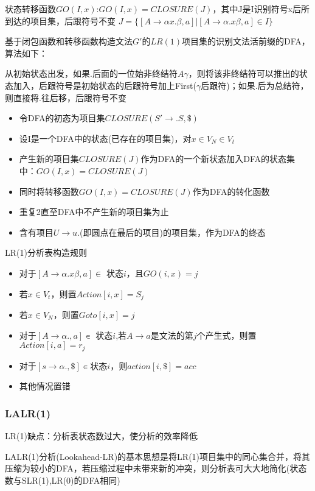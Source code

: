 \documentclass[utf8]{ctexart}
\begin{document}
状态转移函数$GO(I,x)$:$GO(I,x)=CLOSURE(J)$，其中J是I识别符号x后所到达的项目集，后跟符号不变
$J=\{[A \rightarrow \alpha x.\beta,a]|[A \rightarrow \alpha .x\beta ,a]\in I\}$

基于闭包函数和转移函数构造文法$G'$的$LR(1)$项目集的识别文法活前缀的DFA，算法如下：

从初始状态出发，如果.后面的一位始非终结符$A\gamma$，则将该非终结符可以推出的状态加入，后跟符号是初始状态的后跟符号加上First($\gamma$后跟符)；如果.后为总结符，则直接将.往后移，后跟符号不变
\begin{itemize}
    \item 令DFA的初态为项目集$CLOSURE({S' \rightarrow .S,\$})$
    \item 设I是一个DFA中的状态(已存在的项目集)，对$x \in V_N \in V_t$
    \item 产生新的项目集$CLOSURE(J)$作为DFA的一个新状态加入DFA的状态集中：$GO(I,x)=CLOSURE(J)$
    \item 同时将转移函数$GO(I,x)=CLOSURE(J)$作为DFA的转化函数
    \item 重复2直至DFA中不产生新的项目集为止
    \item 含有项目$U \rightarrow u.$(即圆点在最后的项目)的项目集，作为DFA的终态
\end{itemize}

\noindent LR(1)分析表构造规则
\begin{itemize}
    \item 对于$[A \rightarrow \alpha .x \beta,a] \in$ 状态$i$，且$GO(i,x)=j$
    \item 若$x \in V_t$，则置$Action[i,x]=S_j$
    \item 若$x \in V_N$，则置$Goto[i,x]=j$
    \item 对于$[A \rightarrow \alpha.,a]∊$ 状态$i$,若$A \rightarrow a$是文法的第$j$个产生式，则置$Action[i,a]=r_j$
    \item 对于$[s \rightarrow \alpha .,\$]∊$状态$i$，则$action[i,\$]=acc$
    \item 其他情况置错
\end{itemize}

\subsubsection{LALR(1)}
LR(1)缺点：分析表状态数过大，使分析的效率降低

LALR(1)分析(Lookahead-LR)的基本思想是将LR(1)项目集中的同心集合并，将其压缩为较小的DFA，若压缩过程中未带来新的冲突，则分析表可大大地简化(状态数与SLR(1),LR(0)的DFA相同)
\end{document}

